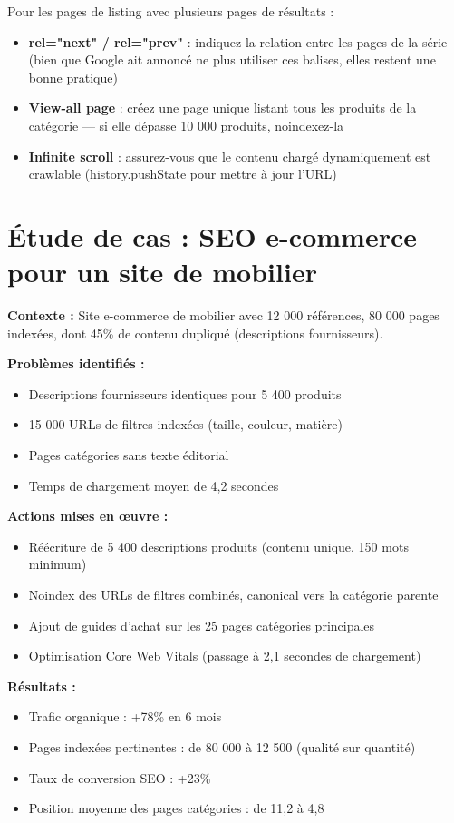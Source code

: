 \documentclass[12pt,a4paper,twoside]{report}
\begin{document}
Pour les pages de listing avec plusieurs pages de résultats :

\begin{itemize}
    \item \textbf{rel="next" / rel="prev"} : indiquez la relation entre les pages de la série (bien que Google ait annoncé ne plus utiliser ces balises, elles restent une bonne pratique)
    \item \textbf{View-all page} : créez une page unique listant tous les produits de la catégorie --- si elle dépasse 10 000 produits, noindexez-la
    \item \textbf{Infinite scroll} : assurez-vous que le contenu chargé dynamiquement est crawlable (history.pushState pour mettre à jour l'URL)
\end{itemize}

\section{Étude de cas : SEO e-commerce pour un site de mobilier}

\textbf{Contexte :} Site e-commerce de mobilier avec 12 000 références, 80 000 pages indexées, dont 45\% de contenu dupliqué (descriptions fournisseurs).

\textbf{Problèmes identifiés :}
\begin{itemize}
    \item Descriptions fournisseurs identiques pour 5 400 produits
    \item 15 000 URLs de filtres indexées (taille, couleur, matière)
    \item Pages catégories sans texte éditorial
    \item Temps de chargement moyen de 4,2 secondes
\end{itemize}

\textbf{Actions mises en œuvre :}
\begin{itemize}
    \item Réécriture de 5 400 descriptions produits (contenu unique, 150 mots minimum)
    \item Noindex des URLs de filtres combinés, canonical vers la catégorie parente
    \item Ajout de guides d'achat sur les 25 pages catégories principales
    \item Optimisation Core Web Vitals (passage à 2,1 secondes de chargement)
\end{itemize}

\textbf{Résultats :}
\begin{itemize}
    \item Trafic organique : +78\% en 6 mois
    \item Pages indexées pertinentes : de 80 000 à 12 500 (qualité sur quantité)
    \item Taux de conversion SEO : +23\%
    \item Position moyenne des pages catégories : de 11,2 à 4,8
\end{itemize}
\end{document}

